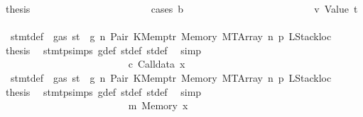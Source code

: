 \begin{isabellebody}
\ {\isacharquery}{\kern0pt}thesis\isanewline
\ \ \ \ \ \ \ \ \ \ \ \ \ \ \ \ \ \ \ \ \ \ \isamarkupfalse%
\ {\isacharparenleft}{\kern0pt}cases\ b{\isacharparenright}{\kern0pt}\isanewline
\ \ \ \ \ \ \ \ \ \ \ \ \ \ \ \ \ \ \ \ \ \ \ \ \isamarkupfalse%
\ v{}{\isacharcolon}{\kern0pt}\ {\isacharparenleft}{\kern0pt}Value\ t{\isacharprime}{\kern0pt}{\isacharparenright}{\kern0pt}\isanewline
\ \ \ \ \ \ \ \ \ \ \ \ \ \ \ \ \ \ \ \ \ \ \ \ \isamarkupfalse%
\ {}{\isacharparenleft}{\kern0pt}{}{\isacharparenright}{\kern0pt}\ stmt{\isacharunderscore}{\kern0pt}def\ {\isacharbackquoteopen}{\isasymnot}\ gas\ st\ {\isasymle}\ g{\isacharbackquoteclose}\ n\ Pair\ KMemptr\ Memory\ MTArray\ n{}\ p{}\ LStackloc\ \isamarkupfalse%
\ {\isacharquery}{\kern0pt}thesis\ \isamarkupfalse%
\ stmt{\isachardot}{\kern0pt}psimps{\isacharparenleft}{\kern0pt}{}{\isacharparenright}{\kern0pt}\ g{\isacharunderscore}{\kern0pt}def\ st{\isacharprime}{\kern0pt}{\isacharunderscore}{\kern0pt}def\ st{\isacharprime}{\kern0pt}{\isacharprime}{\kern0pt}{\isacharunderscore}{\kern0pt}def\ \isamarkupfalse%
\ simp\isanewline
\ \ \ \ \ \ \ \ \ \ \ \ \ \ \ \ \ \ \ \ \ \ \isamarkupfalse%
\isanewline
\ \ \ \ \ \ \ \ \ \ \ \ \ \ \ \ \ \ \ \ \ \ \ \ \isamarkupfalse%
\ c{}{\isacharcolon}{\kern0pt}\ {\isacharparenleft}{\kern0pt}Calldata\ x{}{\isacharparenright}{\kern0pt}\isanewline
\ \ \ \ \ \ \ \ \ \ \ \ \ \ \ \ \ \ \ \ \ \ \ \ \isamarkupfalse%
\ {}{\isacharparenleft}{\kern0pt}{}{\isacharparenright}{\kern0pt}\ stmt{\isacharunderscore}{\kern0pt}def\ {\isacharbackquoteopen}{\isasymnot}\ gas\ st\ {\isasymle}\ g{\isacharbackquoteclose}\ n\ Pair\ KMemptr\ Memory\ MTArray\ n{}\ p{}\ LStackloc\ \isamarkupfalse%
\ {\isacharquery}{\kern0pt}thesis\ \isamarkupfalse%
\ stmt{\isachardot}{\kern0pt}psimps{\isacharparenleft}{\kern0pt}{}{\isacharparenright}{\kern0pt}\ g{\isacharunderscore}{\kern0pt}def\ st{\isacharprime}{\kern0pt}{\isacharunderscore}{\kern0pt}def\ st{\isacharprime}{\kern0pt}{\isacharprime}{\kern0pt}{\isacharunderscore}{\kern0pt}def\ \isamarkupfalse%
\ simp\isanewline
\ \ \ \ \ \ \ \ \ \ \ \ \ \ \ \ \ \ \ \ \ \ \isamarkupfalse%
\isanewline
\ \ \ \ \ \ \ \ \ \ \ \ \ \ \ \ \ \ \ \ \ \ \ \ \isamarkupfalse%
\ m{}{\isacharcolon}{\kern0pt}\ {\isacharparenleft}{\kern0pt}Memory\ x{}{\isacharparenright}{\kern0pt}\isanewline

\end{isabellebody}

